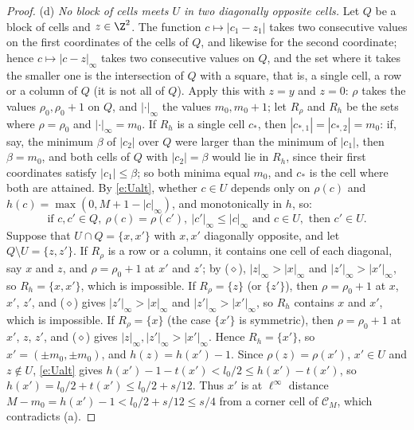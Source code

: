 \begin{proof}
(d) \emph{No block of cells meets $U$ in two diagonally opposite cells.} Let $Q$ be a block of cells and $z \in \Z^2$. The function $c \mapsto |c_1 - z_1|$ takes two consecutive values on the first coordinates of the cells of $Q$, and likewise for the second coordinate; hence $c \mapsto |c - z|_\infty$ takes two consecutive values on $Q$, and the set where it takes the smaller one is the intersection of $Q$ with a square, that is, a single cell, a row or a column of $Q$ (it is not all of $Q$). Apply this with $z = y$ and $z = 0$: $\rho$ takes the values $\rho_0, \rho_0 + 1$ on $Q$, and $|\cdot|_\infty$ the values $m_0, m_0 + 1$; let $R_\rho$ and $R_h$ be the sets where $\rho = \rho_0$ and $|\cdot|_\infty = m_0$. If $R_h$ is a single cell $c_*$, then $|c_{*, 1}| = |c_{*, 2}| = m_0$: if, say, the minimum $\beta$ of $|c_2|$ over $Q$ were larger than the minimum of $|c_1|$, then $\beta = m_0$, and both cells of $Q$ with $|c_2| = \beta$ would lie in $R_h$, since their first coordinates satisfy $|c_1| \le \beta$; so both minima equal $m_0$, and $c_*$ is the cell where both are attained. By \eqref{e:Ualt}, whether $c \in U$ depends only on $\rho(c)$ and $h(c) = \max(0, M + 1 - |c|_\infty)$, and monotonically in $h$, so:
\begin{equation*}
\text{if } c, c' \in Q, \ \rho(c) = \rho(c'), \ |c'|_\infty \le |c|_\infty \text{ and } c \in U, \text{ then } c' \in U. \tag{$\diamond$}
\end{equation*}
Suppose that $U \cap Q = \{x, x'\}$ with $x, x'$ diagonally opposite, and let $Q \setminus U = \{z, z'\}$. If $R_\rho$ is a row or a column, it contains one cell of each diagonal, say $x$ and $z$, and $\rho = \rho_0 + 1$ at $x'$ and $z'$; by ($\diamond$), $|z|_\infty > |x|_\infty$ and $|z'|_\infty > |x'|_\infty$, so $R_h = \{x, x'\}$, which is impossible. If $R_\rho = \{z\}$ (or $\{z'\}$), then $\rho = \rho_0 + 1$ at $x$, $x'$, $z'$, and ($\diamond$) gives $|z'|_\infty > |x|_\infty$ and $|z'|_\infty > |x'|_\infty$, so $R_h$ contains $x$ and $x'$, which is impossible. If $R_\rho = \{x\}$ (the case $\{x'\}$ is symmetric), then $\rho = \rho_0 + 1$ at $x'$, $z$, $z'$, and ($\diamond$) gives $|z|_\infty, |z'|_\infty > |x'|_\infty$. Hence $R_h = \{x'\}$, so $x' = (\pm m_0, \pm m_0)$, and $h(z) = h(x') - 1$. Since $\rho(z) = \rho(x')$, $x' \in U$ and $z \notin U$, \eqref{e:Ualt} gives $h(x') - 1 - t(x') < l_0/2 \le h(x') - t(x')$, so $h(x') = l_0/2 + t(x') \le l_0/2 + s/12$. Thus $x'$ is at $\ell^\infty$ distance $M - m_0 = h(x') - 1 < l_0/2 + s/12 \le s/4$ from a corner cell of $\mathcal C_M$, which contradicts (a).


\end{proof}
